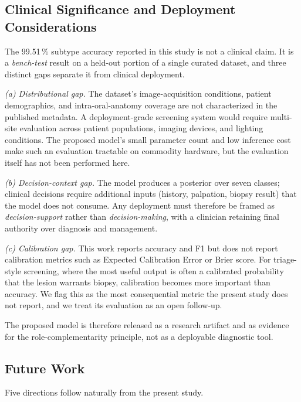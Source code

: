 \subsection{Clinical Significance and Deployment
Considerations}\label{subsec:clinical}

The 99.51\,\% subtype accuracy reported in this study is not a clinical claim.
It is a \emph{bench-test} result on a held-out portion of a single curated
dataset, and three distinct gaps separate it from clinical deployment.

\emph{(a) Distributional gap.} The dataset's image-acquisition conditions,
patient demographics, and intra-oral-anatomy coverage are not characterized in
the published metadata. A deployment-grade screening system would require
multi-site evaluation across patient populations, imaging devices, and lighting
conditions. The proposed model's small parameter count and low inference cost
make such an evaluation tractable on commodity hardware, but the evaluation
itself has not been performed here.

\emph{(b) Decision-context gap.} The model produces a posterior over seven
classes; clinical decisions require additional inputs (history, palpation,
biopsy result) that the model does not consume. Any deployment must
therefore be framed as \emph{decision-support} rather than
\emph{decision-making}, with a clinician retaining final authority over
diagnosis and management.

\emph{(c) Calibration gap.} This work reports accuracy and F1 but does not
report calibration metrics such as Expected Calibration Error or Brier score.
For triage-style screening, where the most useful output is often a
calibrated probability that the lesion warrants biopsy, calibration becomes
more important than accuracy. We flag this as the most consequential metric the
present study does not report, and we treat its evaluation as an open
follow-up.

The proposed model is therefore released as a research artifact and as evidence
for the role-complementarity principle, not as a deployable diagnostic tool.

\subsection{Future Work}\label{subsec:future}

Five directions follow naturally from the present study.

